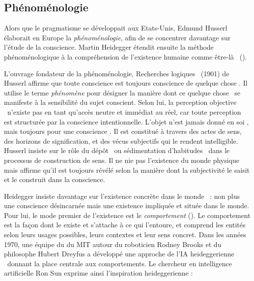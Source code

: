 \subsection{Phénoménologie}
\label{sec:phenomenologie}

\noindent
Alors que le pragmatisme se développait aux Etats-Unis, Edmund Husserl élaborait en Europe la \emph{phénoménologie}, afin de se concentrer davantage sur l'étude de la conscience.
Martin Heidegger étendit ensuite la méthode phénoménologique à la compréhension de l'existence humaine comme \og être-là \fg\ (). 

L'ouvrage fondateur de la phénoménologie, \og Recherches logiques \fg\ (1901) de Husserl affirme que \og toute conscience est toujours conscience de quelque chose \fg. 
Il utilise le terme \emph{phénomène} pour désigner la manière dont ce \og quelque chose \fg\ se manifeste à la sensibilité du sujet conscient. 
Selon lui, la \og perception objective \fg\ n’existe pas en tant qu’accès neutre et immédiat au réel, car toute perception est structurée par la conscience intentionnelle. 
L'objet n’est jamais donné \og en soi \fg, mais toujours \og pour une conscience \fg.
Il est constitué à travers des actes de sens, des horizons de signification, et des vécus subjectifs qui le rendent intelligible. 
Husserl insiste sur le rôle du \og dépôt \fg\ ou \og sédimentation d'habitudes \fg\ dans le processus de construction de sens.
Il ne nie pas l'existence du monde physique mais affirme qu'il est toujours révélé selon la manière dont la subjectivité le saisit et le construit dans la conscience.

Heidegger insiste davantage sur l'existence concrète \og dans le monde \fg\ : non plus une conscience désincarnée mais une existence impliquée et située dans le monde. 
Pour lui, le mode premier de l'existence est le \emph{comportement} (). 
Le comportement est la façon dont le  existe et s'attache à ce qui l'entoure, et comprend les entités selon leurs usages possibles, leurs contextes et leur sens concret.
Dans les années 1970, une équipe du  du MIT autour du roboticien Rodney Brooks et du philosophe Hubert Dreyfus a développé une approche de l'IA \og heideggerienne \fg\ donnant la place centrale aux comportements.
Le chercheur en intelligence artificielle Ron Sun exprime ainsi l'inspiration heideggerienne : 

